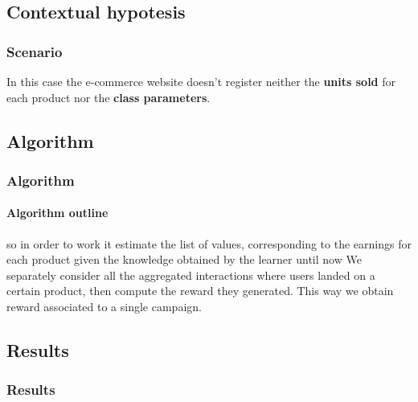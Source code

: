 
\subsection{Contextual hypotesis}


\begin{frame}

\frametitle{Scenario}

In this case the e-commerce website doesn't register neither the \textbf{units sold} for each product nor the \textbf{class parameters}.


\end{frame}


\subsection{Algorithm}


\begin{frame}

\frametitle{Algorithm}
\framesubtitle{Algorithm outline}

so in order to work it estimate the list of values, corresponding to the earnings for each product given the knowledge obtained by the learner until now
We separately consider all the aggregated interactions where users landed on a certain product, then compute the reward they generated.
This way we obtain reward associated to a single campaign.


\end{frame}


\subsection{Results}


\begin{frame}

\frametitle{Results}
\framesubtitle{}


\end{frame}

